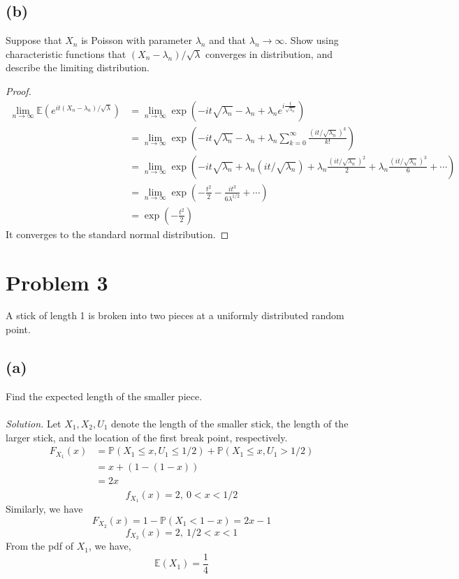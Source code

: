 \documentclass{article}
\newcommand{\prob}{\mathbb{P}}
\newcommand{\E}{\mathbb{E}}
\begin{document}
\subsection*{(b)}
Suppose that $X_n$ is Poisson with parameter $\lambda_n$ and that $\lambda_n \rightarrow \infty$. Show using characteristic functions that $(X_n-\lambda_n)/\sqrt{\lambda}$ converges in distribution, and describe the limiting distribution.
\color{blue}
\begin{proof}
\begin{equation*}
    \begin{split}
        \lim_{n \rightarrow \infty}\E(e^{it(X_n-\lambda_n)/\sqrt{\lambda}}) &= \lim_{n \rightarrow \infty} \exp{(-it\sqrt{\lambda_n}-\lambda_n+\lambda_n e^{i\frac{t}{\sqrt{\lambda_n}}})}\\
        &=\lim_{n \rightarrow \infty}\exp{\left(-it\sqrt{\lambda_n}-\lambda_n+\lambda_n \sum_{k=0}^\infty\frac{(it/\sqrt{\lambda_n})^k}{k!}\right)}\\
        &=\lim_{n \rightarrow \infty}\exp{\left(-it\sqrt{\lambda_n}+\lambda_n(it/\sqrt{\lambda_n})+\lambda_n \frac{(it/\sqrt{\lambda_n})^2}{2}+\lambda_n \frac{(it/\sqrt{\lambda_n})^3}{6}+\cdots\right)}\\
        &=\lim_{n \rightarrow \infty}\exp{\left(-\frac{t^2}{2}- \frac{it^3}{6\lambda^{1/2}}+\cdots\right)}\\
        &=\exp{\left(-\frac{t^2}{2}\right)}
    \end{split}
\end{equation*}
It converges to the standard normal distribution.
\end{proof}
\color{black}
\section*{Problem 3}
A stick of length 1 is broken into two pieces at a uniformly distributed random point.
\subsection*{(a)}
Find the expected length of the smaller piece.
\color{blue}
\\\\\textit{Solution. }Let $X_1,X_2,U_1$ denote the length of the smaller stick, the length of the larger stick, and the location of the first break point, respectively.
\begin{equation*}
    \begin{split}
        F_{X_1}(x) &= \prob(X_1\leq x, U_1\leq 1/2) + \prob(X_1\leq x, U_1> 1/2)\\
        &= x+ (1-(1-x))\\
        &= 2x\\
    \end{split}
\end{equation*}
$$f_{X_1}(x) = 2,\ 0<x<1/2$$
Similarly, we have
$$F_{X_2}(x) = 1-\prob(X_1<1-x) = 2x-1 $$
$$f_{X_2}(x) = 2,\ 1/2<x<1$$
From the pdf of $X_1$, we have,
$$\E(X_1)=\frac{1}{4}$$
\color{black}
\end{document}
